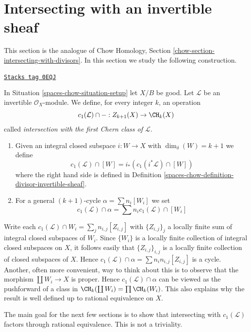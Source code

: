 \section{Intersecting with an invertible sheaf}
\label{spaces-chow-section-intersecting-with-divisors}
This section is the analogue of
Chow Homology, Section \ref{chow-section-intersecting-with-divisors}.
In this section we study the following construction.

\begin{definition}[Cap c1]
\label{spaces-chow-definition-cap-c1}
\href{https://stacks.math.columbia.edu/tag/0EQJ}{\texttt{Stacks tag 0EQJ}}

In Situation \ref{spaces-chow-situation-setup} let $X/B$ be good.
Let $\mathcal{L}$ be an invertible $\mathcal{O}_X$-module.
We define, for every integer $k$, an operation
$$
c_1(\mathcal{L}) \cap - :
Z_{k + 1}(X) \to \CH_k(X)
$$
called {\it intersection with the first Chern class of $\mathcal{L}$}.
\begin{enumerate}
\item Given an integral closed subspace $i : W \to X$ with
$\dim_\delta(W) = k + 1$ we define
$$
c_1(\mathcal{L}) \cap [W] = i_*(c_1({i^*\mathcal{L}}) \cap [W])
$$
where the right hand side is defined in
Definition \ref{spaces-chow-definition-divisor-invertible-sheaf}.
\item For a general $(k + 1)$-cycle $\alpha = \sum n_i [W_i]$ we set
$$
c_1(\mathcal{L}) \cap \alpha = \sum n_i c_1(\mathcal{L}) \cap [W_i]
$$
\end{enumerate}
\end{definition}

Write each $c_1(\mathcal{L}) \cap W_i = \sum_j n_{i, j} [Z_{i, j}]$
with $\{Z_{i, j}\}_j$ a locally finite sum
of integral closed subspaces of $W_i$. Since $\{W_i\}$ is a locally
finite collection of integral closed subspaces on $X$, it follows
easily that $\{Z_{i, j}\}_{i, j}$ is a locally finite collection
of closed subspaces of $X$. Hence
$c_1(\mathcal{L}) \cap \alpha = \sum n_in_{i, j}[Z_{i, j}]$
is a cycle. Another, often more convenient, way to think about this
is to observe that the morphism $\coprod W_i \to X$ is
proper. Hence $c_1(\mathcal{L}) \cap \alpha$ can be viewed
as the pushforward of a class in $\CH_k(\coprod W_i) = \prod \CH_k(W_i)$.
This also explains why the result is well defined up to rational
equivalence on $X$.

\medskip\noindent
The main goal for the next few sections is to show that intersecting with
$c_1(\mathcal{L})$ factors through rational equivalence.
This is not a triviality.

